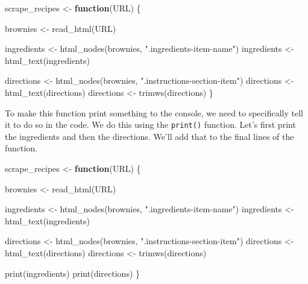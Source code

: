 \documentclass[
]{krantz}
\makeatletter
\newenvironment{Shaded}{\begin{snugshade}}{\end{snugshade}}
\newcommand{\ControlFlowTok}[1]{\textcolor[rgb]{0.27,0.27,0.27}{\textbf{#1}}}
\newcommand{\FunctionTok}[1]{\textcolor[rgb]{0,0,0}{#1}}
\newcommand{\NormalTok}[1]{#1}
\newcommand{\OtherTok}[1]{\textcolor[rgb]{0.37,0.37,0.37}{#1}}
\newcommand{\StringTok}[1]{\textcolor[rgb]{0.5,0.5,0.5}{#1}}
\newenvironment{kframe}{%
\medskip{}
\setlength{\fboxsep}{.8em}
 \def\at@end@of@kframe{}%
 \ifinner\ifhmode%
  \def\at@end@of@kframe{\end{minipage}}%
  \begin{minipage}{\columnwidth}%
 \fi\fi%
 \def\FrameCommand##1{\hskip\@totalleftmargin \hskip-\fboxsep
 \colorbox{shadecolor}{##1}\hskip-\fboxsep
     \hskip-\linewidth \hskip-\@totalleftmargin \hskip\columnwidth}%
 \MakeFramed {\advance\hsize-\width
   \@totalleftmargin\z@ \linewidth\hsize
   \@setminipage}}%
 {\par\unskip\endMakeFramed%
 \at@end@of@kframe}
\renewenvironment{Shaded}{\begin{kframe}}{\end{kframe}}
\makeatother
\begin{document}
\begin{Shaded}
\begin{Highlighting}[]
\NormalTok{scrape\_recipes }\OtherTok{\textless{}{-}} \ControlFlowTok{function}\NormalTok{(URL) \{}
  
\NormalTok{  brownies }\OtherTok{\textless{}{-}} \FunctionTok{read\_html}\NormalTok{(URL)}
  
\NormalTok{  ingredients }\OtherTok{\textless{}{-}} \FunctionTok{html\_nodes}\NormalTok{(brownies, }\StringTok{".ingredients{-}item{-}name"}\NormalTok{)}
\NormalTok{  ingredients }\OtherTok{\textless{}{-}} \FunctionTok{html\_text}\NormalTok{(ingredients)}
  
\NormalTok{  directions }\OtherTok{\textless{}{-}} \FunctionTok{html\_nodes}\NormalTok{(brownies, }\StringTok{".instructions{-}section{-}item"}\NormalTok{)}
\NormalTok{  directions }\OtherTok{\textless{}{-}} \FunctionTok{html\_text}\NormalTok{(directions)}
\NormalTok{  directions }\OtherTok{\textless{}{-}} \FunctionTok{trimws}\NormalTok{(directions)}
\NormalTok{\}}
\end{Highlighting}
\end{Shaded}

To make this function print something to the console, we need to specifically tell it to do so in the code. We do this using the \texttt{print()} function. Let's first print the ingredients and then the directions. We'll add that to the final lines of the function.

\begin{Shaded}
\begin{Highlighting}[]
\NormalTok{scrape\_recipes }\OtherTok{\textless{}{-}} \ControlFlowTok{function}\NormalTok{(URL) \{}
  
\NormalTok{  brownies }\OtherTok{\textless{}{-}} \FunctionTok{read\_html}\NormalTok{(URL)}
  
\NormalTok{  ingredients }\OtherTok{\textless{}{-}} \FunctionTok{html\_nodes}\NormalTok{(brownies, }\StringTok{".ingredients{-}item{-}name"}\NormalTok{)}
\NormalTok{  ingredients }\OtherTok{\textless{}{-}} \FunctionTok{html\_text}\NormalTok{(ingredients)}
  
\NormalTok{  directions }\OtherTok{\textless{}{-}} \FunctionTok{html\_nodes}\NormalTok{(brownies, }\StringTok{".instructions{-}section{-}item"}\NormalTok{)}
\NormalTok{  directions }\OtherTok{\textless{}{-}} \FunctionTok{html\_text}\NormalTok{(directions)}
\NormalTok{  directions }\OtherTok{\textless{}{-}} \FunctionTok{trimws}\NormalTok{(directions)}
  
  \FunctionTok{print}\NormalTok{(ingredients)}
  \FunctionTok{print}\NormalTok{(directions)}
\NormalTok{\}}
\end{Highlighting}
\end{Shaded}
\end{document}
